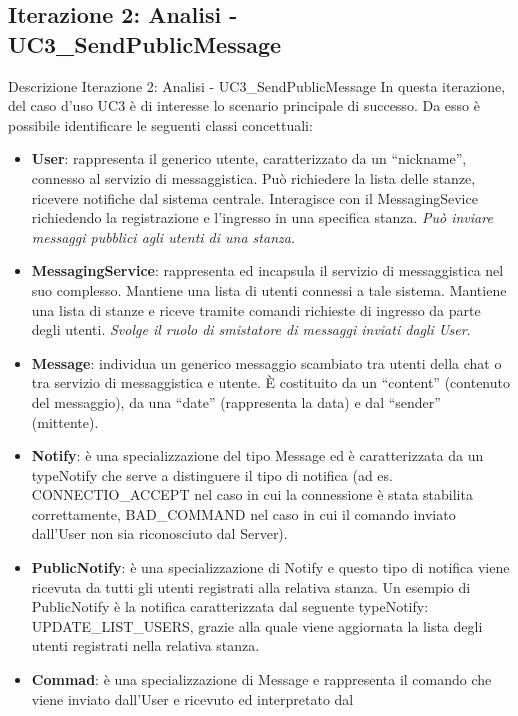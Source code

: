 \subsection {Iterazione 2: Analisi - UC3\_SendPublicMessage}
\begin{frame} [allowframebreaks] {Descrizione Iterazione 2: Analisi - UC3\_SendPublicMessage}
  In questa iterazione, del caso d’uso UC3 è di interesse lo scenario principale di successo.  Da esso è possibile identificare le seguenti classi concettuali: 
  \begin{itemize}
   \item \textbf{User}: rappresenta il generico utente, caratterizzato da un ``nickname'', connesso al servizio di messaggistica. Può richiedere la lista delle 
         stanze, ricevere notifiche dal sistema centrale. Interagisce con il MessagingSevice richiedendo la registrazione e l’ingresso in una specifica stanza. 
         \textit{Può inviare messaggi pubblici agli utenti di una stanza}.
   \item \textbf{MessagingService}: rappresenta ed incapsula il servizio di messaggistica nel suo complesso. Mantiene una lista di utenti connessi a tale sistema. 
          Mantiene una lista di stanze e riceve tramite comandi richieste di ingresso da parte degli utenti. \textit{Svolge il ruolo di smistatore di messaggi 
          inviati dagli User}.
   \item \textbf{Message}: individua un generico messaggio scambiato tra utenti della chat o tra servizio di messaggistica e utente. È costituito da un 
         ``content'' (contenuto del messaggio), da una ``date'' (rappresenta la data) e dal ``sender'' (mittente).
   \item \textbf{Notify}: è una specializzazione del tipo Message ed è caratterizzata da un typeNotify che serve a distinguere il tipo di notifica (ad es. 
          CONNECTIO\_ACCEPT nel caso in cui la connessione è stata stabilita correttamente, BAD\_COMMAND nel caso in cui il comando inviato dall'User non 
          sia riconosciuto dal Server).
    \item \textbf{PublicNotify}: è una specializzazione di Notify e questo tipo di notifica viene ricevuta da tutti gli utenti registrati alla relativa 
          stanza. Un esempio di PublicNotify è la notifica caratterizzata dal seguente typeNotify: UPDATE\_LIST\_USERS, grazie alla quale viene 
          aggiornata la lista degli utenti registrati nella relativa stanza.
   \item  \textbf{Commad}: è una specializzazione di Message e rappresenta il comando che viene inviato dall'User e ricevuto ed interpretato dal            

\end{itemize}
\end{frame}
